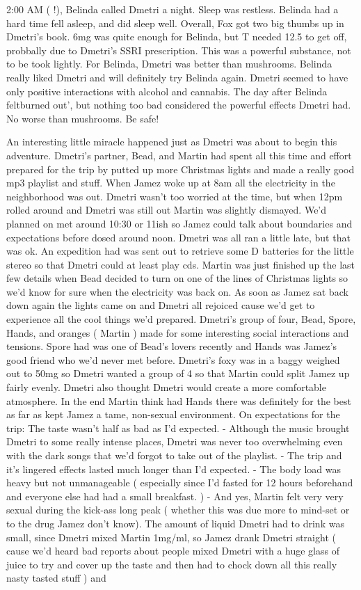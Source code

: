 \documentclass[12pt]{book}
\begin{document}
2:00 AM ( !), Belinda called Dmetri a night. Sleep was restless. Belinda had a hard time fell asleep, and did sleep well. Overall, Fox got two big thumbs up in Dmetri's book. 6mg was quite enough for Belinda, but T needed 12.5 to get off, probbally due to Dmetri's SSRI prescription. This was a powerful substance, not to be took lightly. For Belinda, Dmetri was better than mushrooms. Belinda really liked Dmetri and will definitely try Belinda again. Dmetri seemed to have only positive interactions with alcohol and cannabis. The day after Belinda feltburned out', but nothing too bad considered the powerful effects Dmetri had. No worse than mushrooms. Be safe!



An interesting little miracle happened just as Dmetri was about to begin this adventure. Dmetri's partner, Bead, and Martin had spent all this time and effort prepared for the trip by putted up more Christmas lights and made a really good mp3 playlist and stuff. When Jamez woke up at 8am all the electricity in the neighborhood was out. Dmetri wasn't too worried at the time, but when 12pm rolled around and Dmetri was still out Martin was slightly dismayed. We'd planned on met around 10:30 or 11ish so Jamez could talk about boundaries and expectations before dosed around noon. Dmetri was all ran a little late, but that was ok. An expedition had was sent out to retrieve some D batteries for the little stereo so that Dmetri could at least play cds. Martin was just finished up the last few details when Bead decided to turn on one of the lines of Christmas lights so we'd know for sure when the electricity was back on. As soon as Jamez sat back down again the lights came on and Dmetri all rejoiced cause we'd get to experience all the cool things we'd prepared. Dmetri's group of four, Bead, Spore, Hands, and oranges ( Martin ) made for some interesting social interactions and tensions. Spore had was one of Bead's lovers recently and Hands was Jamez's good friend who we'd never met before. Dmetri's foxy was in a baggy weighed out to 50mg so Dmetri wanted a group of 4 so that Martin could split Jamez up fairly evenly. Dmetri also thought Dmetri would create a more comfortable atmosphere. In the end Martin think had Hands there was definitely for the best as far as kept Jamez a tame, non-sexual environment. On expectations for the trip: The taste wasn't half as bad as I'd expected. - Although the music brought Dmetri to some really intense places, Dmetri was never too overwhelming even with the dark songs that we'd forgot to take out of the playlist. - The trip and it's lingered effects lasted much longer than I'd expected. - The body load was heavy but not unmanageable ( especially since I'd fasted for 12 hours beforehand and everyone else had had a small breakfast. ) - And yes, Martin felt very very sexual during the kick-ass long peak ( whether this was due more to mind-set or to the drug Jamez don't know). The amount of liquid Dmetri had to drink was small, since Dmetri mixed Martin 1mg/ml, so Jamez drank Dmetri straight ( cause we'd heard bad reports about people mixed Dmetri with a huge glass of juice to try and cover up the taste and then had to chock down all this really nasty tasted stuff ) and 
\end{document}
